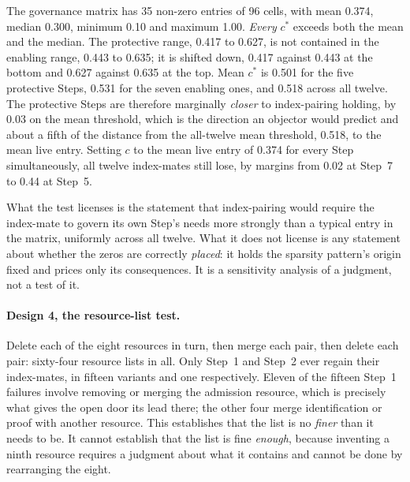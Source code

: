 \documentclass[11pt,a4paper]{article}
\begin{document}
The governance matrix has 35 non-zero entries of 96 cells, with mean 0.374, median
0.300, minimum 0.10 and maximum 1.00. \emph{Every} $c^{*}$ exceeds both the mean
and the median. The protective range, 0.417 to 0.627, is not contained in the
enabling range, 0.443 to 0.635; it is shifted down, 0.417 against 0.443 at the bottom and 0.627 against 0.635 at the top. Mean $c^{*}$ is
0.501 for the five protective Steps, 0.531 for the seven enabling ones, and 0.518
across all twelve. The protective Steps are therefore marginally \emph{closer} to
index-pairing holding, by 0.03 on the mean threshold, which is the direction an
objector would predict and about a fifth of the distance from the
all-twelve mean threshold, 0.518, to the mean live entry. Setting $c$ to the mean live entry of 0.374 for every Step
simultaneously, all twelve index-mates still lose, by margins from 0.02 at Step~7
to 0.44 at Step~5.

What the test licenses is the statement that index-pairing would require the
index-mate to govern its own Step's needs more strongly than a typical entry in
the matrix, uniformly across all twelve. What it does not license is any statement
about whether the zeros are correctly \emph{placed}: it holds the sparsity
pattern's origin fixed and prices only its consequences. It is a sensitivity
analysis of a judgment, not a test of it.

\paragraph{Design 4, the resource-list test.} Delete each of the eight resources
in turn, then merge each pair, then delete each pair: sixty-four resource lists in
all. Only Step~1 and Step~2 ever regain their index-mates, in fifteen variants and
one respectively. Eleven of the fifteen Step~1 failures involve removing or merging
the admission resource, which is precisely what gives the open door its lead there;
the other four merge identification or proof with another resource. This establishes that the list is no \emph{finer} than it needs to be.
It cannot establish that the list is fine \emph{enough}, because inventing a ninth
resource requires a judgment about what it contains and cannot be done by
rearranging the eight.
\end{document}
